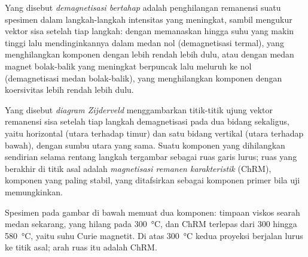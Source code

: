 \begin{definition}\label{def:b3:palaeomagnetism:demag}
Yang disebut \emph{demagnetisasi bertahap} adalah penghilangan
remanensi suatu spesimen dalam langkah-langkah intensitas yang meningkat, sambil mengukur
vektor sisa setelah tiap langkah: dengan memanaskan hingga suhu yang makin tinggi lalu
mendinginkannya dalam medan nol (demagnetisasi termal), yang menghilangkan komponen dengan
 lebih rendah lebih dulu, atau dengan medan magnet bolak-balik yang meningkat
berpuncak lalu meluruh ke nol (demagnetisasi medan bolak-balik), yang menghilangkan
komponen dengan koersivitas lebih rendah lebih dulu.
\end{definition}

\begin{definition}\label{def:b3:palaeomagnetism:zijderveld}
Yang disebut \emph{diagram Zijderveld} menggambarkan titik-titik ujung
vektor remanensi sisa setelah tiap langkah demagnetisasi pada dua bidang
sekaligus, yaitu horizontal (utara terhadap timur) dan satu bidang vertikal (utara
terhadap bawah), dengan sumbu utara yang sama. Suatu komponen yang dihilangkan sendirian selama rentang
langkah tergambar sebagai ruas garis lurus; ruas yang berakhir di titik asal adalah
\emph{magnetisasi remanen karakteristik}
(ChRM), komponen yang paling stabil, yang ditafsirkan sebagai komponen primer
bila uji memungkinkan.
\end{definition}

Spesimen pada gambar di bawah memuat dua komponen: timpaan viskos
searah medan sekarang, yang hilang pada \qty{300}{\celsius}, dan ChRM
terlepas dari 300 hingga \qty{580}{\celsius}, yaitu suhu Curie magnetit.
Di atas \qty{300}{\celsius} kedua proyeksi berjalan lurus ke titik asal; arah
ruas itu adalah ChRM.

